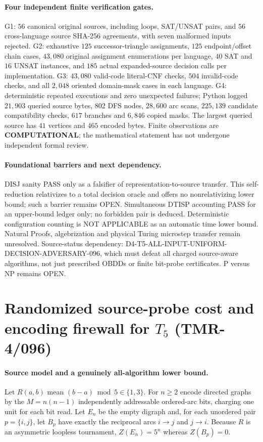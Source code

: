 \documentclass[11pt]{article}
\begin{document}
\paragraph{Four independent finite verification gates.}
G1: $56$ canonical original sources, including loops,
SAT/UNSAT pairs, and $56$ cross-language source SHA-256
agreements, with seven malformed inputs rejected.
G2: exhaustive $125$ successor-triangle assignments,
$125$ endpoint/offset chain cases, $43{,}080$ original
assignment enumerations per language, $40$ SAT and $16$
UNSAT instances, and $185$ actual expanded-source
decision calls per implementation.
G3: $43{,}080$ valid-code literal-CNF checks,
$504$ invalid-code checks, and all $2{,}048$
oriented domain-mask cases in each language.
G4: deterministic repeated executions and zero
unexpected failures; Python logged $21{,}903$ queried
source bytes, $802$ DFS nodes, $28{,}600$ arc scans,
$225{,}139$ candidate compatibility checks,
$617$ branches and $6{,}846$ copied masks.
The largest queried source has $41$ vertices
and $465$ encoded bytes. Finite observations are
\textbf{COMPUTATIONAL}; the mathematical statement
has not undergone independent formal review.

\paragraph{Foundational barriers and next dependency.}
DISJ sanity PASS only as a falsifier of representation-to-source
transfer. This self-reduction relativizes to a total decision
oracle and offers no nonrelativizing lower bound; such a
barrier remains OPEN. Simultaneous DTISP accounting PASS
for an upper-bound ledger only; no forbidden pair is deduced.
Deterministic configuration counting is NOT APPLICABLE
as an automatic time lower bound. Natural Proofs,
algebrization and physical Turing microstep transfer remain
unresolved. Source-status dependency:
D4-T5-ALL-INPUT-UNIFORM-DECISION-ADVERSARY-096,
which must defeat all charged source-aware algorithms,
not just prescribed OBDDs or finite bit-probe certificates.
P versus NP remains OPEN.


\section{Randomized source-probe cost and encoding firewall for $T_5$ (TMR-4/096)}
\label{sec:tmr4-096-rand-source}
\paragraph{Source model and a genuinely all-algorithm lower bound.}
Let $R(a,b)$ mean $(b-a)\bmod5\in\{1,3\}$. For $n\ge2$
encode directed graphs by the $M=n(n-1)$ independently addressable
ordered-arc bits, charging one unit for each bit read. Let $E_n$
be the empty digraph and, for each unordered pair $p=\{i,j\}$,
let $B_p$ have exactly the reciprocal arcs $i\to j$ and $j\to i$.
Because $R$ is an asymmetric loopless tournament,
$Z(E_n)=5^n$ whereas $Z(B_p)=0$.
\end{document}
